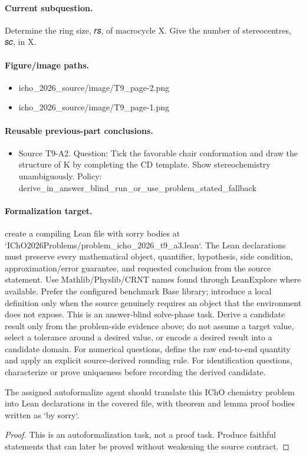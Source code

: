 \paragraph{Current subquestion.}
Determine the ring size, 𝑟𝑠, of macrocycle X. Give the number of stereocentres, 𝑠𝑐, in X.

\paragraph{Figure/image paths.}
\begin{itemize}
\item icho\_2026\_source/image/T9\_page-2.png
\item icho\_2026\_source/image/T9\_page-1.png
\end{itemize}

\paragraph{Reusable previous-part conclusions.}
\begin{itemize}
\item Source T9-A2. Question: Tick the favorable chair conformation and draw the structure of K by completing the CD template. Show stereochemistry unambiguously. Policy: derive\_in\_answer\_blind\_run\_or\_use\_problem\_stated\_fallback
\end{itemize}

\paragraph{Formalization target.}
create a compiling Lean file with sorry bodies at `IChO2026Problems/problem\_icho\_2026\_t9\_a3.lean`.
The Lean declarations must preserve every mathematical object, quantifier, hypothesis, side condition, approximation/error guarantee, and requested conclusion from the source statement.
Use Mathlib/Physlib/CRNT names found through LeanExplore where available. Prefer the configured benchmark Base library; introduce a local definition only when the source genuinely requires an object that the environment does not expose.
This is an answer-blind solve-phase task. Derive a candidate result only from the problem-side evidence above; do not assume a target value, select a tolerance around a desired value, or encode a desired result into a candidate domain.
For numerical questions, define the raw end-to-end quantity and apply an explicit source-derived rounding rule. For identification questions, characterize or prove uniqueness before recording the derived candidate.

\begin{theorem}
\label{thm:physics:icho_2026_t9_a3:target}
The assigned autoformalize agent should translate this IChO chemistry problem into Lean declarations in the covered file, with theorem and lemma proof bodies written as `by sorry`.
\end{theorem}
\begin{proof}
This is an autoformalization task, not a proof task. Produce faithful statements that can later be proved without weakening the source contract.
\end{proof}
